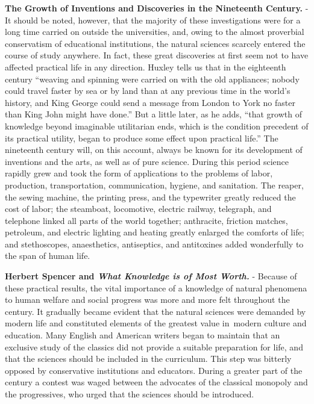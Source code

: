 \documentclass[]{book}
\begin{document}
\textbf{The Growth of Inventions and Discoveries in the Nineteenth Century.} - It should be noted, however, that the majority of these investigations were for a long time carried on outside the universities, and, owing to the almost proverbial conservatism of educational institutions, the natural sciences scarcely entered the course of study anywhere. In fact, these great discoveries at first seem not to have affected practical life in any direction. Huxley tells us that in the eighteenth century ``weaving and spinning were carried on with the old appliances; nobody could travel faster by sea or by land than at any previous time in the world's history, and King George could send a message from London to York no faster than King John might have done.'' But a little later, as he adds, ``that growth of knowledge beyond imaginable utilitarian ends, which is the condition precedent of its practical utility, began to produce some effect upon practical life.'' The nineteenth century will, on this account, always be known for its development of inventions and the arts, as well as of pure science. During this period science rapidly grew and took the form of applications to the problems of labor, production, transportation, communication, hygiene, and sanitation. The reaper, the sewing machine, the printing press, and the typewriter greatly reduced the cost of labor; the steamboat, locomotive, electric railway, telegraph, and telephone linked all parts of the world together; anthracite, friction matches, petroleum, and electric lighting and heating greatly enlarged the comforts of life; and stethoscopes, anaesthetics, antiseptics, and antitoxines added wonderfully to the span of human life.

\textbf{Herbert Spencer and \emph{What Knowledge is of Most Worth.}} - Because of these practical results, the vital importance of a knowledge of natural phenomena to human welfare and social progress was more and more felt throughout the century. It gradually became evident that the natural sciences were demanded by modern life and constituted elements of the greatest value in~modern culture and education. Many English and American writers began to maintain that an exclusive study of the classics did not provide a suitable preparation for life, and that the sciences should be included in the curriculum. This step was bitterly opposed by conservative institutions and educators. During a greater part of the century a contest was waged between the advocates of the classical monopoly and the progressives, who urged that the sciences should be introduced.
\end{document}
